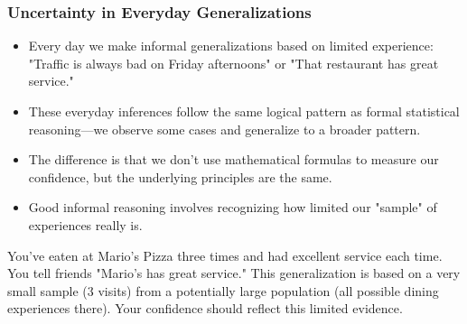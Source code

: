 \documentclass{beamer}
\begin{document}
\begin{frame}
	\frametitle{Uncertainty in Everyday Generalizations}
	
	\begin{itemize}
		\item Every day we make informal generalizations based on limited experience: "Traffic is always bad on Friday afternoons" or "That restaurant has great service."
		\item These everyday inferences follow the same logical pattern as formal statistical reasoning—we observe some cases and generalize to a broader pattern.
		\item The difference is that we don't use mathematical formulas to measure our confidence, but the underlying principles are the same.
		\item Good informal reasoning involves recognizing how limited our "sample" of experiences really is.
	\end{itemize}
	
	\begin{example}
		You've eaten at Mario's Pizza three times and had excellent service each time. You tell friends "Mario's has great service." This generalization is based on a very small sample (3 visits) from a potentially large population (all possible dining experiences there). Your confidence should reflect this limited evidence.
		\end{example}
			
		\end{frame}
		
\end{document}
